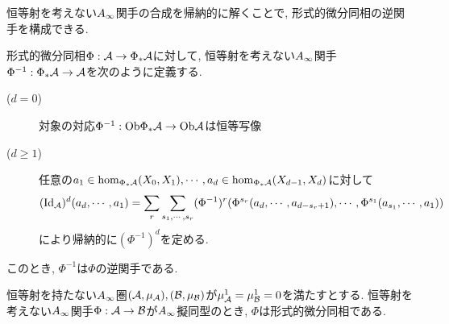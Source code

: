\documentclass[uplatex, a4paper, 14Q, dvipdfmx]{jsarticle}
\begin{document}

恒等射を考えない$A_{\infty}$関手の合成を帰納的に解くことで, 形式的微分同相の逆関手を構成できる. 

\begin{lemma} \label{prop_diffeomorphism_has_inverse}
  形式的微分同相$\Phi: \mathcal{A} \to \Phi_\ast \mathcal{A}$に対して, 恒等射を考えない$A_{\infty}$関手$\Phi^{-1} : \Phi_\ast \mathcal{A} \to \mathcal{A}$を次のように定義する.
  \begin{description}
    \item[($d=0$)] 対象の対応$\Phi^{-1} : \mathrm{Ob}\Phi_\ast \mathcal{A} \to \mathrm{Ob}\mathcal{A}$は恒等写像
    \item[($d \geq 1$)] 任意の$a_1 \in \hom_{\Phi_\ast \mathcal{A}}(X_0,X_1), \cdots, a_d \in \hom_{\Phi_\ast \mathcal{A}}(X_{d-1},X_d)$に対して
    \begin{align*}
      (\mathrm{Id}_{\mathcal{A}})^d (a_d,\cdots,a_1)
      = \sum_r \sum_{s_1,\cdots,s_r} (\Phi^{-1})^r(\Phi^{s_r} (a_d,\cdots,a_{d-s_r+1}), \cdots, \Phi^{s_1}(a_{s_1},\cdots,a_1))
    \end{align*}
    により帰納的に$(\Phi^{-1})^d$を定める.
  \end{description}
  このとき, $\Phi^{-1}$は$\Phi$の逆関手である. 
\end{lemma}

\begin{example} \label{eg_Ainf_qis_with_zero_differential_is_formal_diffeo}
  恒等射を持たない$A_{\infty}$圏$(\mathcal{A},\mu_{\mathcal{A}}), (\mathcal{B},\mu_{\mathcal{B}})$が$\mu^1_{\mathcal{A}}=\mu^1_{\mathcal{B}}=0$を満たすとする.
  恒等射を考えない$A_{\infty}$関手$\Phi : \mathcal{A} \to \mathcal{B}$が$A_{\infty}$擬同型のとき, $\Phi$は形式的微分同相である. 
\end{example}



\end{document}
